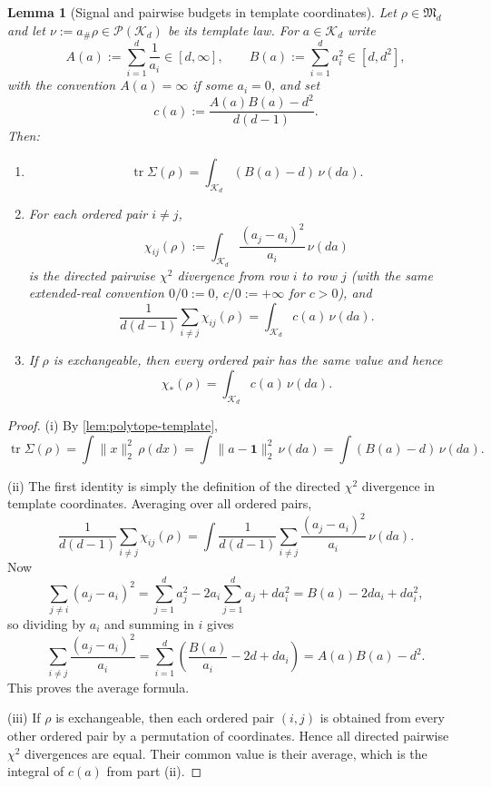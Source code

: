 \documentclass[11pt]{amsart}
\newtheorem{lemma}[lemma]{Lemma}
\theoremstyle{definition}
\DeclareMathOperator{\tr}{tr}
\newcommand{\one}{\mathbf 1}
\newcommand{\cP}{\mathcal P}
\newcommand{\fM}{\mathfrak M}
\newcommand{\cK}{\mathcal K}
\begin{document}
\begin{lemma}[Signal and pairwise budgets in template coordinates]\label{lem:template-formulas}
Let $\rho\in\fM_d$ and let $\nu:=a_\#\rho\in\cP(\cK_d)$ be its template law. For $a\in\cK_d$ write
\[
A(a):=\sum_{i=1}^d \frac1{a_i}\in[ d,\infty],
\qquad
B(a):=\sum_{i=1}^d a_i^2\in[d,d^2],
\]
with the convention $A(a)=\infty$ if some $a_i=0$, and set
\[
c(a):=\frac{A(a)B(a)-d^2}{d(d-1)}.
\]
Then:
\begin{enumerate}[label=\textup{(\roman*)}]
\item
\[
\tr\Sigma(\rho)=\int_{\cK_d} (B(a)-d)\,\nu(da).
\]
\item For each ordered pair $i\neq j$,
\[
\chi_{ij}(\rho):=\int_{\cK_d}\frac{(a_j-a_i)^2}{a_i}\,\nu(da)
\]
is the directed pairwise $\chi^2$ divergence from row $i$ to row $j$ (with the same extended-real convention $0/0:=0$, $c/0:=+\infty$ for $c>0$), and
\[
\frac1{d(d-1)}\sum_{i\neq j}\chi_{ij}(\rho)=\int_{\cK_d} c(a)\,\nu(da).
\]
\item If $\rho$ is exchangeable, then every ordered pair has the same value and hence
\[
\chi_*(\rho)=\int_{\cK_d} c(a)\,\nu(da).
\]
\end{enumerate}
\end{lemma}

\begin{proof}
(i) By \cref{lem:polytope-template},
\[
\tr\Sigma(\rho)=\int \|x\|_2^2\,\rho(dx)=\int \|a-\one\|_2^2\,\nu(da)=\int (B(a)-d)\,\nu(da).
\]

(ii) The first identity is simply the definition of the directed $\chi^2$ divergence in template coordinates. Averaging over all ordered pairs,
\[
\frac1{d(d-1)}\sum_{i\neq j}\chi_{ij}(\rho)
=
\int \frac1{d(d-1)}\sum_{i\neq j}\frac{(a_j-a_i)^2}{a_i}\,\nu(da).
\]
Now
\[
\sum_{j\neq i}(a_j-a_i)^2
=\sum_{j=1}^d a_j^2-2a_i\sum_{j=1}^d a_j+d a_i^2
=B(a)-2d a_i+d a_i^2,
\]
so dividing by $a_i$ and summing in $i$ gives
\[
\sum_{i\neq j}\frac{(a_j-a_i)^2}{a_i}
=\sum_{i=1}^d\left(\frac{B(a)}{a_i}-2d+d a_i\right)
=A(a)B(a)-d^2.
\]
This proves the average formula.

(iii) If $\rho$ is exchangeable, then each ordered pair $(i,j)$ is obtained from every other ordered pair by a permutation of coordinates. Hence all directed pairwise $\chi^2$ divergences are equal. Their common value is their average, which is the integral of $c(a)$ from part (ii).
\end{proof}
\end{document}
